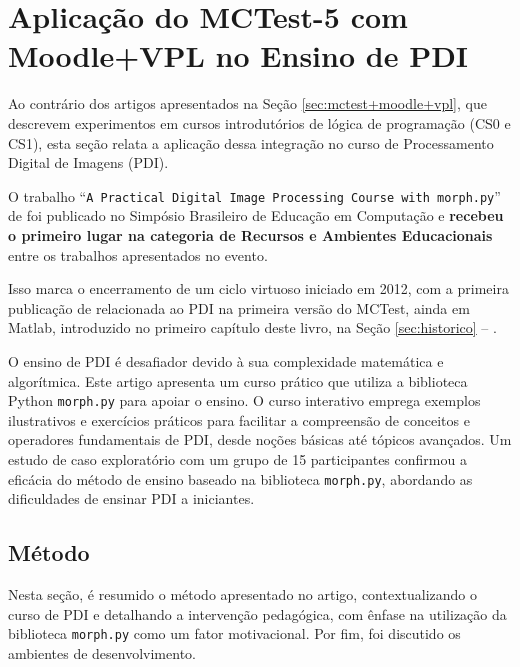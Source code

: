 \section{Aplicação do MCTest-5 com Moodle+VPL no Ensino de PDI}\label{sec:mctest+moodle+vpl+pdi}

Ao contrário dos artigos apresentados na Seção \ref{sec:mctest+moodle+vpl}, que descrevem experimentos em cursos introdutórios de lógica de programação (CS0 e CS1), esta seção relata a aplicação dessa integração no curso de Processamento Digital de Imagens (PDI).

O trabalho ``\texttt{A Practical Digital Image Processing Course with \texttt{morph.py}}'' de  foi publicado no Simpósio Brasileiro de Educação em Computação e \textbf{recebeu o primeiro lugar na categoria de Recursos e Ambientes Educacionais} entre os trabalhos apresentados no evento.

Isso marca o encerramento de um ciclo virtuoso iniciado em 2012, com a primeira publicação de  relacionada ao PDI na primeira versão do MCTest, ainda em Matlab, introduzido no primeiro capítulo deste livro, na Seção \ref{sec:historico} -- .

O ensino de PDI é desafiador devido à sua complexidade matemática e algorítmica. Este artigo apresenta um curso prático que utiliza a biblioteca Python \texttt{morph.py} para apoiar o ensino. O curso interativo emprega exemplos ilustrativos e exercícios práticos para facilitar a compreensão de conceitos e operadores fundamentais de PDI, desde noções básicas até tópicos avançados. Um estudo de caso exploratório com um grupo de 15 participantes confirmou a eficácia do método de ensino baseado na biblioteca \texttt{morph.py}, abordando as dificuldades de ensinar PDI a iniciantes.


\subsection{Método}

Nesta seção, é resumido o método apresentado no artigo, contextualizando o curso de PDI e detalhando a intervenção pedagógica, com ênfase na utilização da biblioteca \verb|morph.py| como um fator motivacional. Por fim, foi discutido os ambientes de desenvolvimento.

